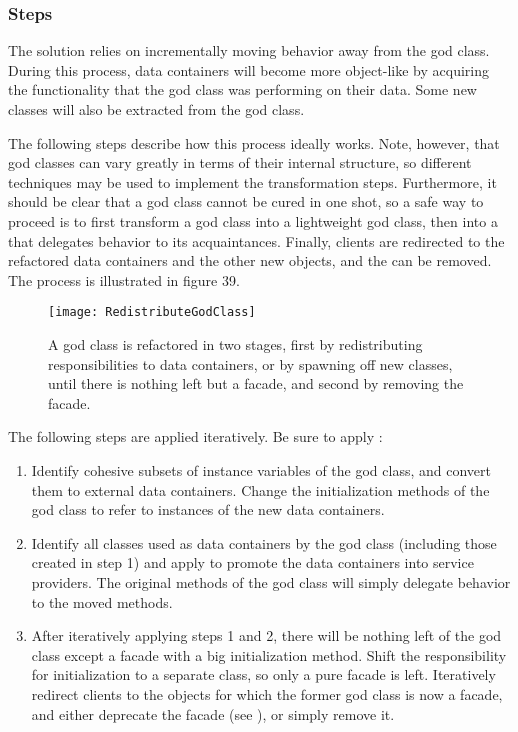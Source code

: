 \documentclass[a4paper,10pt,twoside]{book}
\begin{document}
\subsubsection*{Steps}

The solution relies on incrementally moving behavior away from the god class. During this process, data containers will become more object-like by acquiring the functionality that the god class was performing on their data. Some new classes will also be extracted from the god class.

The following steps describe how this process ideally works. Note, however, that god classes can vary greatly in terms of their internal structure, so different techniques may be used to implement the transformation steps. Furthermore, it should be clear that a god class cannot be cured in one shot, so a safe way to proceed is to first transform a god class into a lightweight god class, then into a  that delegates behavior to its acquaintances. Finally, clients are redirected to the refactored data containers and the other new objects, and the  can be removed. The process is illustrated in figure 39.

\begin{figure}
\begin{center}
\texttt{[image: RedistributeGodClass]}
\caption{A god class is refactored in two stages, first by redistributing responsibilities to data containers, or by spawning off new classes, until there is nothing left but a facade, and second by removing the facade.}
\end{center}
\end{figure}

The following steps are applied iteratively. Be sure to apply :
\begin{enumerate}
  \item Identify cohesive subsets of instance variables of the god class, and convert them to external data containers. Change the initialization methods of the god class to refer to instances of the new data containers.

  \item Identify all classes used as data containers by the god class (including those created in step 1) and apply  to promote the data containers into service providers. The original methods of the god class will simply delegate behavior to the moved methods.

  \item After iteratively applying steps 1 and 2, there will be nothing left of the god class except a facade with a big initialization method. Shift the responsibility for initialization to a separate class, so only a pure facade is left. Iteratively redirect clients to the objects for which the former god class is now a facade, and either deprecate the facade (see ), or simply remove it.
\end{enumerate}
\end{document}
